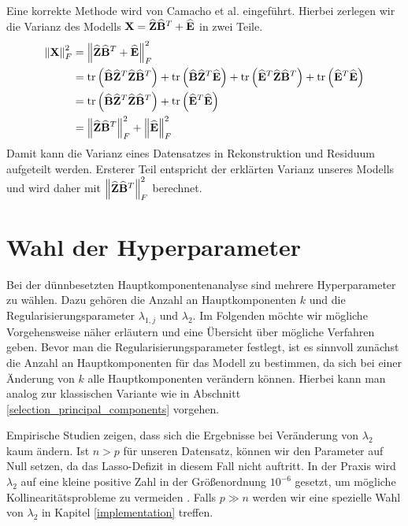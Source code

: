 Eine korrekte Methode wird von Camacho et al. eingeführt. Hierbei zerlegen wir die Varianz des Modells $\mathbf{X} = \widehat{\mathbf{Z}} \widehat{\mathbf{B}}^T + \widehat{\mathbf{E}}$ in zwei Teile.
\begin{align}
\label{camacho_explained_variance}
\left\lVert \mathbf{X} \right\rVert_F^2 & = \left\lVert \widehat{\mathbf{Z}} \widehat{\mathbf{B}}^T + \widehat{\mathbf{E}} \right\rVert_{F}^{2} \nonumber\\
& = \text{tr} \left( \widehat{\mathbf{B}} \widehat{\mathbf{Z}}^T \widehat{\mathbf{Z}} \widehat{\mathbf{B}}^T \right) + \text{tr} \left( \widehat{\mathbf{B}} \widehat{\mathbf{Z}}^T \widehat{\mathbf{E}} \right) + \text{tr} \left( \widehat{\mathbf{E}}^T\widehat{\mathbf{Z}} \widehat{\mathbf{B}}^T \right) + \text{tr} \left( \widehat{\mathbf{E}}^T \widehat{\mathbf{E}} \right) \nonumber\\
& = \text{tr} \left( \widehat{\mathbf{B}} \widehat{\mathbf{Z}}^T \widehat{\mathbf{Z}} \widehat{\mathbf{B}}^T \right) + \text{tr} \left( \widehat{\mathbf{E}}^T \widehat{\mathbf{E}} \right) \nonumber\\
& = \left\lVert \widehat{\mathbf{Z}} \widehat{\mathbf{B}}^T \right\rVert_{F}^{2} + \left\lVert \widehat{\mathbf{E}} \right\rVert_{F}^{2}
\end{align}
Damit kann die Varianz eines Datensatzes in Rekonstruktion und Residuum aufgeteilt werden. Ersterer Teil entspricht der erklärten Varianz unseres Modells und wird daher mit $\left\lVert \widehat{\mathbf{Z}} \widehat{\mathbf{B}}^T \right\rVert_{F}^{2}$ berechnet. 



\section{Wahl der Hyperparameter}
\label{choice_of_tuning_parameters}

Bei der dünnbesetzten Hauptkomponentenanalyse sind mehrere Hyperparameter zu wählen. Dazu gehören die Anzahl an Hauptkomponenten $k$ und die Regularisierungsparameter $\lambda_{1,j}$ und $\lambda_2$. Im Folgenden möchte wir mögliche Vorgehensweise näher erläutern und eine Übersicht über mögliche Verfahren geben. Bevor man die Regularisierungsparameter festlegt, ist es sinnvoll zunächst die Anzahl an Hauptkomponenten für das Modell zu bestimmen, da sich bei einer Änderung von $k$ alle Hauptkomponenten verändern können. Hierbei kann man analog zur klassischen Variante wie in Abschnitt \ref{selection_principal_components} vorgehen.

Empirische Studien zeigen, dass sich die Ergebnisse bei Veränderung von $\lambda_2$ kaum ändern. Ist $n > p$ für unseren Datensatz, können wir den Parameter auf Null setzen, da das Lasso-Defizit in diesem Fall nicht auftritt. In der Praxis wird $\lambda_2$ auf eine kleine positive Zahl in der Größenordnung $10^{-6}$ gesetzt, um mögliche Kollinearitätsprobleme zu vermeiden \cite{zou_sparsepca}. Falls $p \gg n$ werden wir eine spezielle Wahl von $\lambda_2$ in Kapitel \ref{implementation} treffen.

